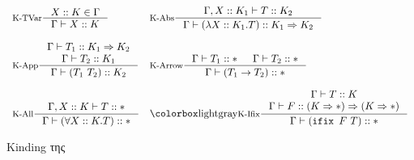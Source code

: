 \begin{figure}[!ht]
    \centering
    \begin{minipage}[t]{15cm}
    \centering
    \begin{displaymath}
    \begin{array}{ll}
    \inference[K-TVar]{X::K \in \Gamma}{\Gamma \vdash X :: K} &
    \inference[K-Abs]{\Gamma, X::K_1 \vdash T :: K_2}{\Gamma \vdash (\lambda X::K_1.T) :: K_1 \kindArrow K_2} \\
    \\
    \inference[K-App]{\Gamma \vdash T_1 :: K_1 \kindArrow K_2 \\ \Gamma \vdash T_2 :: K_1}{\Gamma \vdash (T_1 ~ T_2) :: K_2} &
    \inference[K-Arrow]{\Gamma \vdash T_1 :: \Type & \Gamma \vdash T_2 :: \Type}{\Gamma \vdash (T_1 \rightarrow T_2) :: \Type} \\
    \\
    \inference[K-All]{\Gamma, X::K \vdash T :: \Type}{\Gamma \vdash (\forall X::K.T) :: \Type} &
    \fomfDiff{\inference[K-Ifix]{\Gamma \vdash T:: K \\ \Gamma \vdash F :: (K \kindArrow \Type) \kindArrow (K \kindArrow \Type)} {\Gamma \vdash (\ifix ~ F ~ T) :: \Type} } 
    \end{array}
    \end{displaymath}
    \end{minipage}
    \caption{Kinding της \FIR}
    \label{fig:fir_kinding}
\end{figure}
